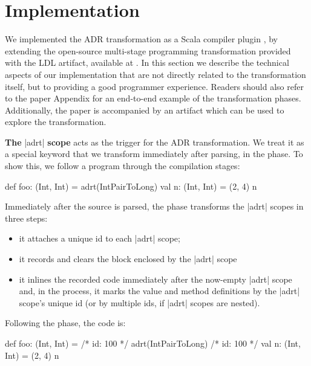 \section{Implementation}
\label{sec:impl}

We implemented the ADR transformation as a Scala compiler plugin \cite{ildl-plugin}, by extending the open-source multi-stage programming transformation provided with the LDL \cite{ldl} artifact, available at \cite{ldl-staging-plugin}. In this section we describe the technical aspects of our implementation that are not directly related to the transformation itself, but to providing a good programmer experience. Readers should also refer to the paper Appendix for an end-to-end example of the transformation phases. Additionally, the paper is accompanied by an artifact which can be used to explore the transformation.

\vspace{0.3em}
\noindent \textbf{The} |adrt| \textbf{scope} acts as the trigger for the ADR transformation.
We treat it as a special keyword that we transform immediately after parsing, in the \postparser{} phase.
To show this, we follow a program through the compilation stages:

\begin{lstlisting-nobreak}
def foo: (Int, Int) = {
  adrt(IntPairToLong) {
    val n: (Int, Int) = (2, 4)
  }
  n
}
\end{lstlisting-nobreak}

\noindent
Immediately after the source is parsed, the \postparser{} phase transforms the |adrt| scopes in three steps:

\vspace{0.3em}
\begin{itemize}
\item it attaches a unique id to each |adrt| scope;
\item it records and clears the block enclosed by the |adrt| scope
\item it inlines the recorded code immediately after the now-empty
|adrt| scope and, in the process, it marks the value and method definitions
by the |adrt| scope's unique id (or by multiple ids, if |adrt| scopes are nested).
\end{itemize}
\vspace{0.3em}

\noindent Following the \postparser{} phase, the code is:

\begin{lstlisting-nobreak}
def foo: (Int, Int) = {
  /* id: 100 */ adrt(IntPairToLong) {}
  /* id: 100 */ val n: (Int, Int) = (2, 4)
  n
}
\end{lstlisting-nobreak}

